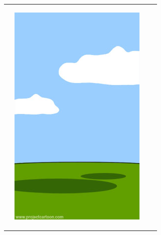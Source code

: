 \begin{tabularx}{\textwidth}{XXXX}
\begin{minipage}[t]{0.23\textwidth}
\begin{center}
\vspace*{3mm}
\end{center}
\end{minipage}
& 
\begin{minipage}[t]{0.23\textwidth}
\begin{center}
\includegraphics[width=1.0\textwidth]{./inf/SEKII/29_Softwaretechnik/PM_07.jpg}


\end{center}
\end{minipage}
\end{tabularx}

